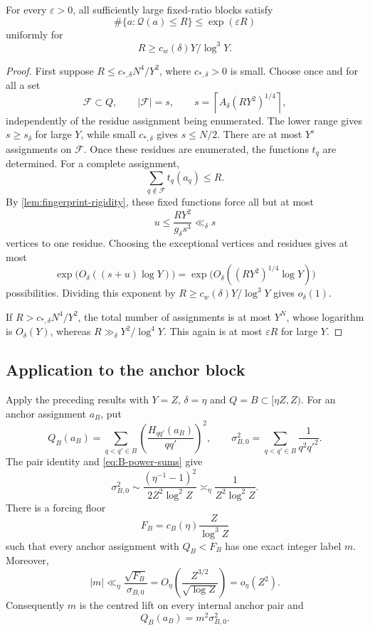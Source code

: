 \begin{proposition}
\label{prop:fingerprint-entropy}
For every $\varepsilon>0$, all sufficiently large fixed-ratio blocks satisfy
\[
 \#\{a:\mathcal Q(a)\leq R\}\leq\exp(\varepsilon R)
\]
uniformly for
\[
 R\geq c_w(\delta)Y/\log^3Y.
\]
\end{proposition}

\begin{proof}
First suppose $R\leq c_{*,\delta}N^4/Y^2$, where $c_{*,\delta}>0$ is small.  Choose once and for all a set
\[
 \mathcal F\subset Q,
 \qquad
 |\mathcal F|=s,
 \qquad
 s=\left\lceil A_\delta(RY^2)^{1/4}\right\rceil,
\]
independently of the residue assignment being enumerated.  The lower range gives $s\geq s_\delta$ for large $Y$, while small $c_{*,\delta}$ gives $s\leq N/2$.  There are at most $Y^s$ assignments on $\mathcal F$.  Once these residues are enumerated, the functions $t_q$ are determined.  For a complete assignment,
\[
 \sum_{q\notin\mathcal F}t_q(a_q)\leq R.
\]
By \cref{lem:fingerprint-rigidity}, these fixed functions force all but at most
\[
 u\leq\frac{RY^2}{g_\delta s^3}\ll_\delta s
\]
vertices to one residue.  Choosing the exceptional vertices and residues gives at most
\[
 \exp\bigl(O_\delta((s+u)\log Y)\bigr)
 =\exp\bigl(O_\delta((RY^2)^{1/4}\log Y)\bigr)
\]
possibilities.  Dividing this exponent by $R\geq c_w(\delta)Y/\log^3Y$ gives $o_\delta(1)$.

If $R>c_{*,\delta}N^4/Y^2$, the total number of assignments is at most $Y^N$, whose logarithm is $O_\delta(Y)$, whereas $R\gg_\delta Y^2/\log^4Y$.  This again is at most $\varepsilon R$ for large $Y$.
\end{proof}

\subsection{Application to the anchor block}

Apply the preceding results with $Y=Z$, $\delta=\eta$ and $Q=B\subset[\eta Z,Z)$.  For an anchor assignment $a_B$, put
\[
 Q_B(a_B)=\sum_{q<q'\in B}
 \left(\frac{H_{qq'}(a_B)}{qq'}\right)^2,
 \qquad
 \sigma_{B,0}^2=\sum_{q<q'\in B}\frac1{q^2q'^2}.
\]
The pair identity and \cref{eq:B-power-sums} give
\begin{equation}
\label{eq:anchor-square-scale}
 \sigma_{B,0}^2
 \sim\frac{(\eta^{-1}-1)^2}{2Z^2\log^2Z}
 \asymp_\eta\frac1{Z^2\log^2Z}.
\end{equation}
There is a forcing floor
\[
 F_B=c_B(\eta)\frac{Z}{\log^3Z}
\]
such that every anchor assignment with $Q_B<F_B$ has one exact integer label $m$.  Moreover,
\[
 |m|\ll_\eta\frac{\sqrt{F_B}}{\sigma_{B,0}}
 =O_\eta\!\left(\frac{Z^{3/2}}{\sqrt{\log Z}}\right)
 =o_\eta(Z^2).
\]
Consequently $m$ is the centred lift on every internal anchor pair and
\begin{equation}
\label{eq:top-exact-energy}
 Q_B(a_B)=m^2\sigma_{B,0}^2.
\end{equation}

